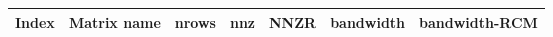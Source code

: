\begin{tabular}{|l|l|r|r|S[round-mode=places,round-precision=2]|r|r|}
\toprule
{Index} & {Matrix name} &  {\acrshort{nrows}} & {\acrshort{nnz}} & {\acrshort{NNZR}}  & {bandwidth} & {bandwidth-RCM} \\
\midrule
\bottomrule
\end{tabular}


